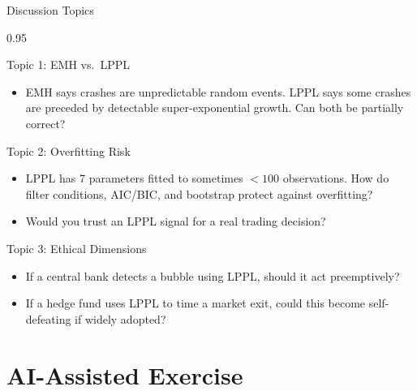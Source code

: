 \documentclass[9pt, aspectratio=169, t]{beamer}
\begin{document}
\begin{frame}{Discussion Topics}
    \begin{cminipage}{0.95\textwidth}
    {\scriptsize
    \begin{block}{Topic 1: EMH vs.\ LPPL}
        \begin{itemize}\setlength{\itemsep}{0pt}
            \item EMH says crashes are unpredictable random events. LPPL says some crashes are preceded by detectable super-exponential growth. Can both be partially correct?
        \end{itemize}
    \end{block}

    \vspace{-2mm}

    \begin{alertblock}{Topic 2: Overfitting Risk}
        \begin{itemize}\setlength{\itemsep}{0pt}
            \item LPPL has 7 parameters fitted to sometimes $<100$ observations. How do filter conditions, AIC/BIC, and bootstrap protect against overfitting?
            \item Would you trust an LPPL signal for a real trading decision?
        \end{itemize}
    \end{alertblock}

    \vspace{-2mm}

    \begin{exampleblock}{Topic 3: Ethical Dimensions}
        \begin{itemize}\setlength{\itemsep}{0pt}
            \item If a central bank detects a bubble using LPPL, should it act preemptively?
            \item If a hedge fund uses LPPL to time a market exit, could this become self-defeating if widely adopted?
        \end{itemize}
    \end{exampleblock}
    }
    \end{cminipage}
\end{frame}

\section{AI-Assisted Exercise}
\end{document}
